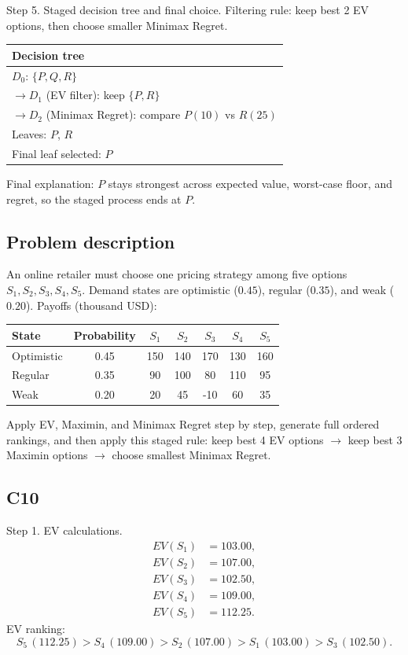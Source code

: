 \begin{ExamProblems}
		Step 5. Staged decision tree and final choice.
		Filtering rule: keep best 2 EV options, then choose smaller Minimax Regret.
		\begin{center}
			\begin{tabular}{l}
				\toprule
				Decision tree \\
				\midrule
				$D_0$: $\{P,Q,R\}$ \\
				$\rightarrow D_1$ (EV filter): keep $\{P,R\}$ \\
				$\rightarrow D_2$ (Minimax Regret): compare $P(10)$ vs $R(25)$ \\
				Leaves: $P$, $R$ \\
				Final leaf selected: $P$ \\
				\bottomrule
			\end{tabular}
		\end{center}
		Final explanation: $P$ stays strongest across expected value, worst-case floor, and regret, so the staged process ends at $P$.

		\newpage
		\item\leavevmode\par
		\subsection*{Problem description}
		An online retailer must choose one pricing strategy among five options $S_1,S_2,S_3,S_4,S_5$.
		Demand states are optimistic ($0.45$), regular ($0.35$), and weak ($0.20$).
		Payoffs (thousand USD):
		\begin{center}
			\begin{tabular}{l c c c c c c}
				\toprule
				State & Probability & $S_1$ & $S_2$ & $S_3$ & $S_4$ & $S_5$ \\
				\midrule
				Optimistic & 0.45 & 150 & 140 & 170 & 130 & 160 \\
				Regular & 0.35 & 90 & 100 & 80 & 110 & 95 \\
				Weak & 0.20 & 20 & 45 & -10 & 60 & 35 \\
				\bottomrule
			\end{tabular}
		\end{center}
		Apply EV, Maximin, and Minimax Regret step by step, generate full ordered rankings, and then apply this staged rule:
		keep best 4 EV options $\rightarrow$ keep best 3 Maximin options $\rightarrow$ choose smallest Minimax Regret.

		\subsection*{C10}
		Step 1. EV calculations.
		\[
		\begin{aligned}
		EV(S_1)&=103.00,\\
		EV(S_2)&=107.00,\\
		EV(S_3)&=102.50,\\
		EV(S_4)&=109.00,\\
		EV(S_5)&=112.25.
		\end{aligned}
		\]
		EV ranking:
		\[
		S_5\,(112.25)>S_4\,(109.00)>S_2\,(107.00)>S_1\,(103.00)>S_3\,(102.50).
		\]


\end{ExamProblems}
